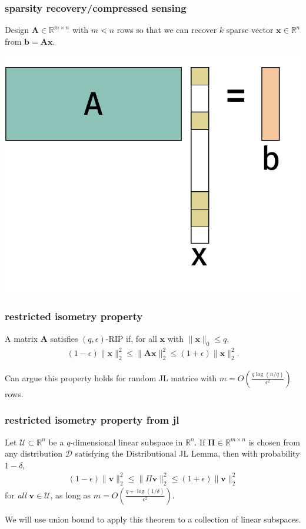 \documentclass[compress]{beamer}
\newcommand{\bs}[1]{\boldsymbol{#1}}
\newcommand{\bv}[1]{\mathbf{#1}}
\newcommand{\R}{\mathbb{R}}
\begin{document}
\begin{frame}
	\frametitle{sparsity recovery/compressed sensing}
	Design $\bv{A}\in\R^{m \times n}$ with $m < n$ rows so that we can recover $k$ sparse vector $\bv{x} \in \R^n$ from $\bv{b} = \bv{Ax}$. 
	\begin{center}
		\includegraphics[width=.5\textwidth]{sparseRegressioon.png}
	\end{center}
\end{frame}
	
	\begin{frame}
		\frametitle{restricted isometry property}
		\begin{definition}
			A matrix $\bv{A}$ satisfies $(q,\epsilon)$-RIP if, for all $\bv{x}$ with $\|\bv{x}\|_0 \leq q$, 
			\begin{align*}
				(1-\epsilon)\|\bv{x}\|_2^2 \leq \|\bv{A}\bv{x}\|_2^2 \leq  (1+\epsilon)\|\bv{x}\|_2^2.
			\end{align*}
		\end{definition}
		Can argue this property holds for random JL matrice with $m = O\left(\frac{q\log (n/q)}{\epsilon^2}\right)$ rows. 
	\end{frame}

	\begin{frame}[t]
		\frametitle{restricted isometry property from jl}
		\begin{theorem}
			Let $\mathcal{U} \subset \R^n$ be a $q$-dimensional linear subspace in $\R^n$. If $\bs{\Pi}\in \R^{m\times n}$ is chosen from any distribution $\mathcal{D}$ satisfying the Distributional  JL Lemma, then with probability $1-\delta$,
			\begin{align*}
				(1-\epsilon)\|\bv{v}\|_2^2 \leq \|\Pi \bv{v}\|_2^2 \leq	(1+\epsilon)\|\bv{v}\|_2^2
			\end{align*}
			for \emph{all} $\bv{v} \in \mathcal{U}$, as long as  $m = O\left(\frac{q + \log(1/\delta)}{\epsilon^2}\right)$.
		\end{theorem}		
		We will use union bound to apply this theorem to a collection of linear subspaces.
	\end{frame}
\end{document}
